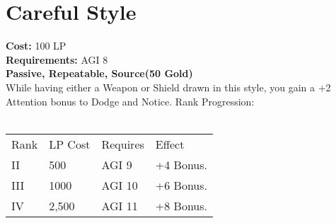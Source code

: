\section{Careful Style}\label{perk:carefulStyle}
\textbf{Cost:} 100 LP\\
\textbf{Requirements:} AGI 8\\
\textbf{Passive, Repeatable, Source(50 Gold)}\\
While having either a Weapon or Shield drawn in this style, you gain a +2 Attention bonus to Dodge and Notice.
Rank Progression:\\
\\
\begin{tabular}{l | l | l | l}
    Rank & LP Cost & Requires & Effect\\
    II & 500 & AGI 9 & +4 Bonus.\\
    III & 1000 & AGI 10 & +6 Bonus.\\
    IV & 2,500 & AGI 11 & +8 Bonus.\\
\end{tabular}